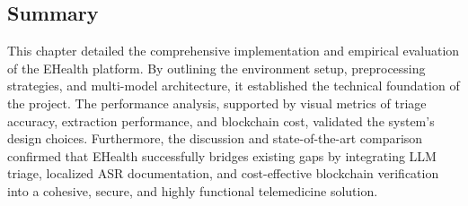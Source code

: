 \subsection*{Summary}
This chapter detailed the comprehensive implementation and empirical evaluation of the EHealth platform. By outlining the environment setup, preprocessing strategies, and multi-model architecture, it established the technical foundation of the project. The performance analysis, supported by visual metrics of triage accuracy, extraction performance, and blockchain cost, validated the system's design choices. Furthermore, the discussion and state-of-the-art comparison confirmed that EHealth successfully bridges existing gaps by integrating LLM triage, localized ASR documentation, and cost-effective blockchain verification into a cohesive, secure, and highly functional telemedicine solution.